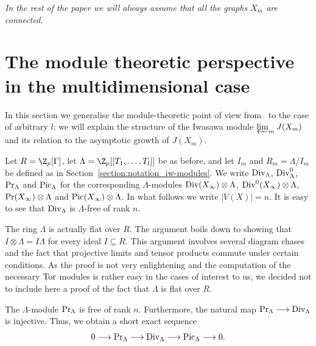 \emph{In the rest of the paper we will always assume that all the graphs $X_m$ are connected.}


\section{The module theoretic perspective in the multidimensional case} \label{section:J(X_m)} 
In this section we generalise the module-theoretic point of view from~\cite{diss-gonet} to the case of arbitrary $l$: we will explain the structure of the Iwasawa module $\varprojlim_m J(X_m)$ and its relation to the asymptotic growth of $J(X_m)$. 


Let ${R = \Z_p[\Gamma]}$, let $\Lambda=\Z_p[[T_1,\ldots ,T_l]]$ be as before, and let $I_m$ and ${R_m = \Lambda/I_m}$ be defined as in Section~\ref{section:notation_iw-modules}. We write $\textup{Div}_\Lambda$, $\textup{Div}^0_\Lambda$, $\textup{Pr}_\Lambda$ and $\textup{Pic}_\Lambda$ for the corresponding $\Lambda$-modules $\textup{Div}(X_\infty)\otimes \Lambda$, $\textup{Div}^0(X_\infty)\otimes \Lambda$, $\textup{Pr}(X_\infty)\otimes \Lambda$ and $\textup{Pic}(X_\infty) \otimes \Lambda$. In what follows we write ${|V(X)| = n}$. It is easy to see that $\textup{Div}_\Lambda$ is $\Lambda$-free of rank $n$. 
\begin{rema}
	The ring $\Lambda$ is actually flat over $R$. The argument boils down to showing that $I\otimes \Lambda=I\Lambda$ for every ideal $I\subseteq R$. This argument involves several diagram chases and the fact that projective limits and tensor products commute under certain conditions. As the proof is not very enlightening and the computation of the necessary $\textup{Tor}$ modules is rather easy in the cases of interest to us, we decided not to include here a proof of the fact that $\Lambda$ is flat over $R$.
\end{rema}
\begin{lemma}
	\label{pr-free}
	The $\Lambda$-module $\textup{Pr}_\Lambda$ is free of rank $n$. Furthermore, the natural map $\textup{Pr}_\Lambda\longrightarrow \textup{Div}_\Lambda$ is injective. Thus, we obtain a short exact sequence
	\[0\longrightarrow \textup{Pr}_\Lambda\longrightarrow \textup{Div}_\Lambda\longrightarrow \textup{Pic}_\Lambda\longrightarrow 0.\]
\end{lemma}
